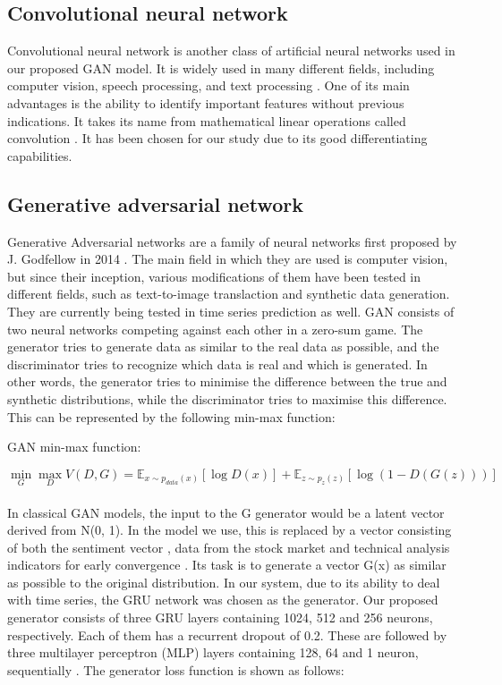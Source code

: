\documentclass[11pt]{article} %
\begin{document}
\subsection{Convolutional neural network}

Convolutional neural network is another class of artificial neural networks used in our proposed GAN model. It is widely used in many different fields, including computer vision, speech processing, and text processing \cite{cnn1}. One of its main advantages is the ability to identify important features without previous indications. It takes its name from mathematical linear operations called convolution \cite{cnn2}. It has been chosen for our study due to its good differentiating capabilities.

\subsection{Generative adversarial network}

Generative Adversarial networks are a family of neural networks first proposed by J. Godfellow in 2014 \cite{gan1}. The main field in which they are used is computer vision, but since their inception, various modifications of them have been tested in different fields, such as text-to-image translaction and synthetic data generation. They are currently being tested in time series prediction as well.  GAN consists of two neural networks competing against each other in a zero-sum game. The generator tries to generate data as similar to the real data as possible, and the discriminator tries to recognize which data is real and which is generated. In other words, the generator tries to minimise the difference between the true and synthetic distributions, while the discriminator tries to maximise this difference. This can be represented by the following min-max function: 

\begin{center}   GAN min-max function: \end{center}
\begin{equation} \min_G \max_D V(D, G)=
\mathbb{E}_{x\sim p_{data}(x)}[\log D(x)]
+ \mathbb{E}_{z\sim p_z(z)}[\log(1 - D(G(z)))] \end{equation}\\

In classical GAN models, the input to the G generator would be a latent vector derived from N(0, 1). In the model we use, this is replaced by a vector consisting of both the sentiment vector \cite{gan-stock}, data from the stock market and technical analysis indicators for early convergence \cite{gan-stock2}. Its task is to generate a vector G(x) as similar as possible to the original distribution. In our system, due to its ability to deal with time series, the GRU network was chosen as the generator. Our proposed generator consists of three GRU layers containing 1024, 512 and 256 neurons, respectively. Each of them has a recurrent dropout of 0.2. These are followed by three multilayer perceptron (MLP) layers containing 128, 64 and 1 neuron, sequentially \cite{gan-stock}\cite{gan-stock2}. 
The generator loss function is shown as follows: 
\end{document}
